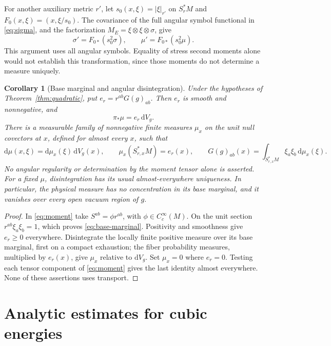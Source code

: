 \documentclass[11pt,a4paper]{article}
\numberwithin{equation}{section}
\newcommand{\dd}{\mathrm d}
\newcommand{\dV}{\dd V_g}
\newtheorem{corollary}[theorem]{Corollary}
\theoremstyle{definition}
\begin{document}
For another auxiliary metric $r'$, let $s_0(x,\xi)=|\xi|_{r'}$ on $S_r^*M$ and $F_0(x,\xi)=(x,\xi/s_0)$. The covariance of the full angular symbol functional in \eqref{eq:sigma}, and the factorization $M_E=\xi\otimes\xi\otimes\sigma$, give
\begin{equation}\label{eq:norm-change}
\sigma'=F_{0*}(s_0^2\sigma),\qquad \mu'=F_{0*}(s_0^2\mu).
\end{equation}
This argument uses all angular symbols. Equality of stress second moments alone would not establish this transformation, since those moments do not determine a measure uniquely.

\begin{corollary}[Base marginal and angular disintegration]
\label{cor:base-marginal}
Under the hypotheses of Theorem~\ref{thm:quadratic}, put
$e_r=r^{ab}G(g)_{ab}$. Then $e_r$ is smooth and nonnegative, and
\begin{equation}\label{eq:base-marginal}
\pi_*\mu=e_r\,\dV.
\end{equation}
There is a measurable family of nonnegative finite measures $\mu_x$ on
the unit null covectors at $x$, defined for almost every $x$, such that
\begin{equation*}
\dd\mu(x,\xi)=\dd\mu_x(\xi)\,\dV(x),\qquad
\mu_x(S_{r,x}^*M)=e_r(x),\qquad
G(g)_{ab}(x)=\int_{S_{r,x}^*M}\xi_a\xi_b\,\dd\mu_x(\xi).
\end{equation*}
No angular regularity or determination by the moment tensor alone is asserted.
For a fixed $\mu$, disintegration has its usual almost-everywhere uniqueness.
In particular,
the physical measure has no concentration in its base marginal, and it
vanishes over every open vacuum region of $g$.
\end{corollary}
\begin{proof}
In \eqref{eq:moment} take $S^{ab}=\phi r^{ab}$, with
$\phi\in C_c^\infty(M)$. On the unit section $r^{ab}\xi_a\xi_b=1$,
which proves \eqref{eq:base-marginal}. Positivity and smoothness give
$e_r\geq0$ everywhere. Disintegrate the locally finite positive measure
over its base marginal, first on a compact exhaustion; the fiber
probability measures, multiplied by $e_r(x)$, give $\mu_x$ relative to
$\dV$. Set $\mu_x=0$ where $e_r=0$. Testing each tensor component of
\eqref{eq:moment} gives the last identity almost everywhere.
None of these assertions uses transport.
\end{proof}

\section{Analytic estimates for cubic energies}\label{sec:analytic}
\end{document}
